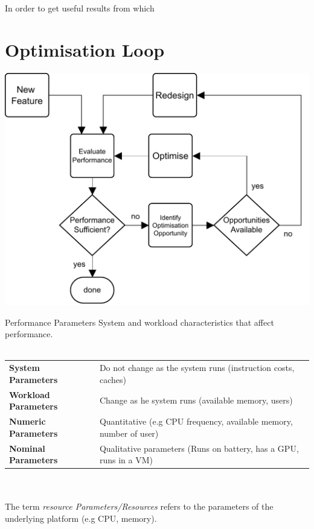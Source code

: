 In order to get useful results from which 

\section{Optimisation Loop}
\begin{center}
    \includegraphics[width=.6\textwidth]{introduction/images/optimisation_loop.drawio.pdf}
\end{center}

\begin{definitionbox}{Performance Parameters}
    System and workload characteristics that affect performance.
     \\
     \\ \begin{tabular}{l p{}}
        \textbf{System Parameters} & Do not change as the system runs (instruction costs, caches) \\
        \textbf{Workload Parameters} & Change as he system runs (available memory, users) \\
        \textbf{Numeric Parameters} & Quantitative (e.g CPU frequency, available memory, number of user) \\
        \textbf{Nominal Parameters} & Qualitative parameters (Runs on battery, has a GPU, runs in a VM) \\
    \end{tabular}
    \\ 
    \\ The term \textit{resource Parameters/Resources} refers to the parameters of the underlying platform (e.g CPU, memory).
\end{definitionbox}



